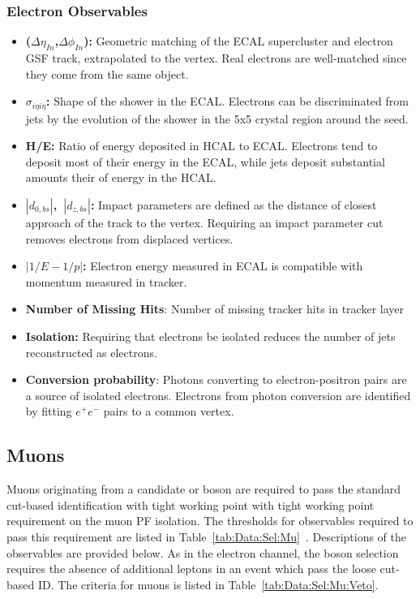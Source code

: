 \subsubsection{Electron Observables}
\begin{itemize}
    \item \textbf{($\Delta\eta_{In}$,$\Delta\phi_{In}$):} Geometric matching of the ECAL supercluster and electron GSF track, extrapolated to the vertex. Real electrons are well-matched since they come from the same object. 
    \item \textbf{$\sigma_{i\eta i\eta}$:} Shape of the shower in the ECAL. Electrons can be discriminated from jets by the evolution of the shower in the 5x5 crystal region around the seed.
    \item \textbf{H/E:} Ratio of energy deposited in HCAL to ECAL. Electrons tend to deposit most of their energy in the ECAL, while jets deposit substantial amounts their of energy in the HCAL.
    \item \textbf{$|d_{0,bs}|$,~$|d_{z,bs}|$:} Impact parameters are defined as the distance of closest approach of the track to the vertex. Requiring an impact parameter cut removes electrons from displaced vertices.
    \item \textbf{$|1/E-1/p|$:} Electron energy measured in ECAL is compatible with momentum measured in tracker.
    \item \textbf{Number of Missing Hits}: Number of missing tracker hits in tracker layer
    \item \textbf{Isolation:} Requiring that electrons be isolated reduces the number of jets reconstructed as electrons.
    \item \textbf{Conversion probability}: Photons converting to electron-positron pairs are a source of isolated electrons. Electrons from photon conversion are identified by fitting $e^+e^-$ pairs to a common vertex.
\end{itemize}




\subsection{Muons}\label{ch:IdIso:Mu}
Muons originating from a candidate \Wpm or \Z boson are required to pass the standard cut-based identification with tight working point with tight working point requirement on the muon PF isolation. The thresholds for observables required to pass this requirement are listed in Table~\ref{tab:Data:Sel:Mu}~\cite{MuonIDIsoCuts}. Descriptions of the observables are provided below. As in the electron channel, the \Wpm boson selection requires the absence of additional leptons in an event which pass the loose cut-based ID. The criteria for muons is listed in Table~\ref{tab:Data:Sel:Mu:Veto}. 
